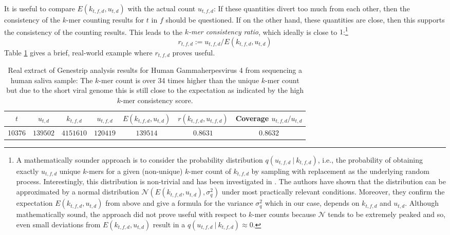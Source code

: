 \documentclass[pdflatex,sn-vancouver-num]{sn-jnl}
\begin{document}
    It is useful to compare $E(k_{t,f,d},u_{t,d})$ with the actual count $u_{t,f,d}$: If these quantities divert too much from each other, then the consistency of the $k$-mer counting results for $t$ in $f$ should be questioned. If on the other hand, these quantities are close, then this supports the consistency of the counting results. This leads to the \emph{$k$-mer consistency ratio}, which ideally is close to $1$:\footnote{A mathematically sounder approach is to consider the probability distribution
        $q(u_{t,f,d}\ |\ k_{t,f,d})$, i.e., the probability of obtaining exactly $u_{t,f,d}$ unique $k$-mers for a given (non-unique) $k$-mer count of $k_{t,f,d}$ by sampling with replacement as the underlying random process.
        Interestingly, this distribution is non-trivial and has been investigated in \cite{Mendelson2016WhatIT}. The authors have shown that the distribution can be approximated by a normal distribution $\mathcal{N}(E(k_{t,f,d},u_{t,d}),\sigma^2_q)$ under most practically relevant conditions. Moreover, they confirm the expectation $E(k_{t,f,d},u_{t,d})$ from above and give a formula for the variance $\sigma^2_q$ which in our case, depends on $k_{t,f,d}$ and $u_{t,d}$.
        Although mathematically sound, the approach did not prove useful with respect to $k$-mer counts because $\mathcal{N}$ tends to be extremely peaked and so, even small deviations from $E(k_{t,f,d},u_{t,d})$ result in a $q(u_{t,f,d}\ |\ k_{t,f,d}) \approx 0$.}
    \begin{equation}
        \label{r}
        r_{t,f,d} := u_{t,f,d} / E(k_{t,f,d},u_{t,d})
    \end{equation}
Table \ref{ebv} gives a brief, real-world example where $r_{t,f,d}$ proves useful.

\begin{table}[h]
\centering
\begin{tabular}{c|c|c|c|c|c|c}
$t$ & $u_{t,d}$ & $k_{t,f,d}$ & $u_{t,f,d}$ & $E(k_{t,f,d},u_{t,d})$ & $r(k_{t,f,d}, u_{t,f,d})$ & Coverage $u_{t,f,d} / u_{t,d}$  \\
  \hline
  10376 & $139502$ & $4151610$ & $120419$ & $139514$ & $0.8631$ & $0.8632$
\end{tabular}
\caption{Real extract of Genestrip analysis results for Human Gammaherpesvirus 4 from sequencing a human saliva sample: The $k$-mer count is over 34 times higher than the unique $k$-mer count but due to the short viral genome this is still close to the expectation as indicated by the high $k$-mer consistency score.}\label{ebv}
\end{table}
\end{document}

